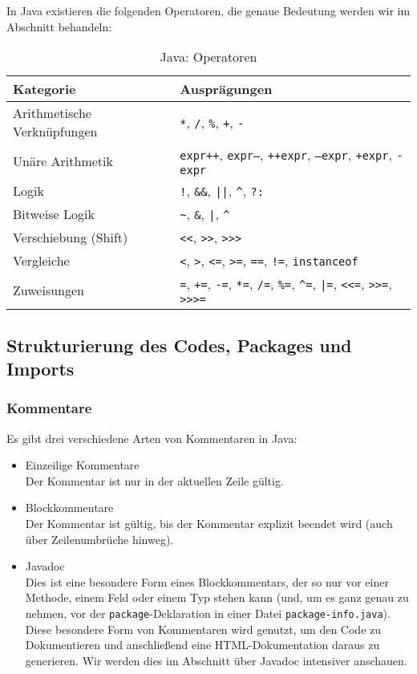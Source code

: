 	In Java existieren die folgenden Operatoren, die genaue Bedeutung werden wir im Abschnitt  behandeln:
	\begin{table}[H]
		\centering
		\begin{tabular}{l | l}
			Kategorie & Ausprägungen \\
			\hline
			Arithmetische Verknüpfungen & \texttt{*}, \texttt{/}, \texttt{\%}, \texttt{+}, \texttt{-} \\
			Unäre Arithmetik            & \texttt{expr++}, \texttt{expr--}, \texttt{++expr}, \texttt{--expr}, \texttt{+expr}, \texttt{-expr} \\
			Logik                       & \texttt{!}, \texttt{\&\&}, \texttt{||}, \texttt{\textasciicircum}, \texttt{?:} \\
			Bitweise Logik              & \texttt{\textasciitilde}, \texttt{\&}, \texttt{|}, \texttt{\textasciicircum} \\
			Verschiebung (Shift)        & \texttt{<{}<}, \texttt{>{}>}, \texttt{>{}>{}>} \\
			Vergleiche                  & \texttt{<}, \texttt{>}, \texttt{<=}, \texttt{>=}, \texttt{==}, \texttt{!=}, \texttt{instanceof} \\
			Zuweisungen                 & \texttt{=}, \texttt{+=}, \texttt{-=}, \texttt{*=}, \texttt{/=}, \texttt{\%=}, \texttt{\textasciicircum=}, \texttt{|=}, \texttt{<{}<=}, \texttt{>{}>=}, \texttt{>{}>{}>=} \\
		\end{tabular}
		\caption{Java: Operatoren}
	\end{table}

\subsection{Strukturierung des Codes, Packages und Imports}
	
	\subsubsection{Kommentare}
		Es gibt drei verschiedene Arten von Kommentaren in Java:
		\begin{itemize}
			\item Einzeilige Kommentare \\ Der Kommentar ist nur in der aktuellen Zeile gültig.
			\item Blockkommentare \\ Der Kommentar ist gültig, bis der Kommentar explizit beendet wird (auch über Zeilenumbrüche hinweg).
			\item Javadoc \\ Dies ist eine besondere Form eines Blockkommentars, der so nur vor einer Methode, einem Feld oder einem Typ stehen kann (und, um es ganz genau zu nehmen, vor der \lstinline|package|-Deklaration in einer Datei \texttt{package-info.java}). Diese besondere Form von Kommentaren wird genutzt, um den Code zu Dokumentieren und anschließend eine HTML-Dokumentation daraus zu generieren. Wir werden dies im Abschnitt  über Javadoc intensiver anschauen.
		\end{itemize}
	
